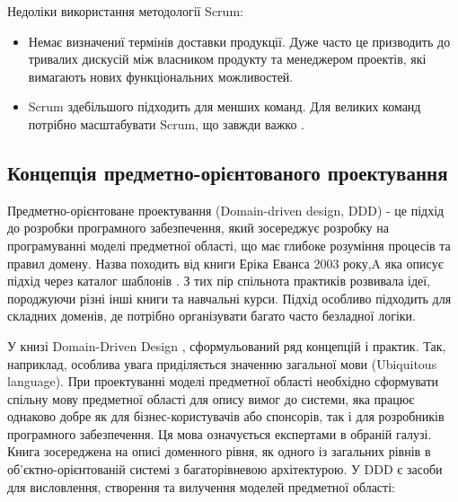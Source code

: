 Недоліки використання методології Scrum:
\begin{itemize}
    \item Немає визначениї термінів доставки продукції. Дуже часто це призводить
      до тривалих дискусій між власником продукту 
      та менеджером проектів, які вимагають нових функціональних можливостей.
    \item Scrum здебільшого підходить для менших команд.
      Для великих команд потрібно масштабувати Scrum, що завжди важко \cite{scrum-pros-cons}.
\end{itemize}


\subsection{Концепція предметно-орієнтованого проектування}

Предметно-орієнтоване проектування (Domain-driven design, DDD) 
- це підхід до розробки програмного забезпечення, 
який зосереджує розробку на програмуванні моделі предметної області,
що має глибоке розуміння процесів та правил домену.
Назва походить від книги Еріка Еванса 2003 року,A
яка описує підхід через каталог шаблонів \cite{ddd-evans}.
З тих пір спільнота практиків розвивала ідеї,
породжуючи різні інші книги та навчальні курси.
Підхід особливо підходить для складних доменів,
де потрібно організувати багато часто безладної логіки.

У книзі Domain-Driven Design \cite{ddd-evans}, сформульований ряд концепцій і практик.
Так, наприклад, особлива увага приділяється значенню загальної мови (Ubiquitous language).
При проектуванні моделі предметної області необхідно сформувати спільну мову
предметної області для опису вимог до системи, яка працює однаково добре
як для бізнес-користувачів або спонсорів, так і для розробників програмного забезпечення.
Ця мова означується експертами в обраній галузі. Книга зосереджена на описі доменного рівня,
як одного із загальних рівнів в об'єктно-орієнтованій системі з багаторівневою архітектурою.
У DDD є засоби для висловлення, створення та вилучення моделей предметної області:

